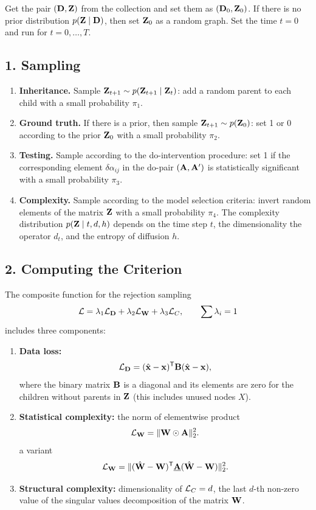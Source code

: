 \documentclass[12pt]{article}
\begin{document}
Get the pair $(\mathbf{D},\mathbf{Z})$ from the collection and set them as $(\mathbf{D}_0,\mathbf{Z}_0)$.
If there is no prior distribution $p(\mathbf{Z}\mid \mathbf{D})$, then set $\mathbf{Z}_0$ as a random graph.
Set the time $t=0$ and run for $t=0,\dots,T$.

\subsection*{1. Sampling}
\begin{enumerate}
    \item \textbf{Inheritance.}
    Sample $\mathbf{Z}_{t+1}\sim p(\mathbf{Z}_{t+1}\mid \mathbf{Z}_t)$:
    add a random parent to each child with a small probability $\pi_1$.
    \item \textbf{Ground truth.}
    If there is a prior, then  sample $\mathbf{Z}_{t+1}\sim p(\mathbf{Z}_0)$:
    set 1 or 0 according to the prior $\mathbf{Z}_0$ with a small probability $\pi_2$.
    \item \textbf{Testing.}
    Sample according to the do-intervention procedure:
    set 1 if the corresponding element $\delta\alpha_{ij}$ in the do-pair $(\mathbf{A},\mathbf{A}{^\prime})$ is statistically significant with a small probability $\pi_3$.
    \item \textbf{Complexity.}
    Sample according to the model selection criteria: invert random elements of the matrix $\mathbf{Z}$ with a small probability $\pi_4$.
    The complexity distribution $p(\mathbf{Z}\mid t, d, h)$ depends on the time step $t$, the dimensionality the operator $d_t$, and the entropy of diffusion $h$.
\end{enumerate}

\subsection*{2. Computing the Criterion}
The composite function for the rejection sampling
\[
    \mathcal{L} = \lambda_1 \mathcal{L}_{\mathbf{D}} + \lambda_2 \mathcal{L}_{\mathbf{W}} + \lambda_3 \mathcal{L}_C, \qquad \sum \lambda_i = 1
\]
includes three components:
\begin{enumerate}
    \item \textbf{Data loss:}
    \[\mathcal{L}_{\mathbf{D}} = (\hat{\mathbf{x}} - \mathbf{x})^{\mathsf{T}} \mathbf{B} (\hat{\mathbf{x}} - \mathbf{x}),\]
    where the binary matrix $\mathbf{B}$ is a diagonal and its elements are zero for the children without parents in $\mathbf{Z}$
    (this includes unused nodes $X$).
    \item \textbf{Statistical complexity:} the norm of elementwise product
    \[\mathcal{L}_{\mathbf{W}} = \| \mathbf{W} \odot \mathbf{A} \|^2_2.\]
    a variant
    \[\mathcal{L}_{\mathbf{W}} = \| (\hat{\mathbf{W}} - \mathbf{W})^{\mathsf{T}} \underline{\mathbf{A}} (\hat{\mathbf{W}} - \mathbf{W})\|^2_2.\]
    \item \textbf{Structural complexity:} dimensionality of $\mathcal{L}_C = d$, the last $d$-th non-zero value of the singular values decomposition of the matrix $\mathbf{W}$.
\end{enumerate}
\end{document}
